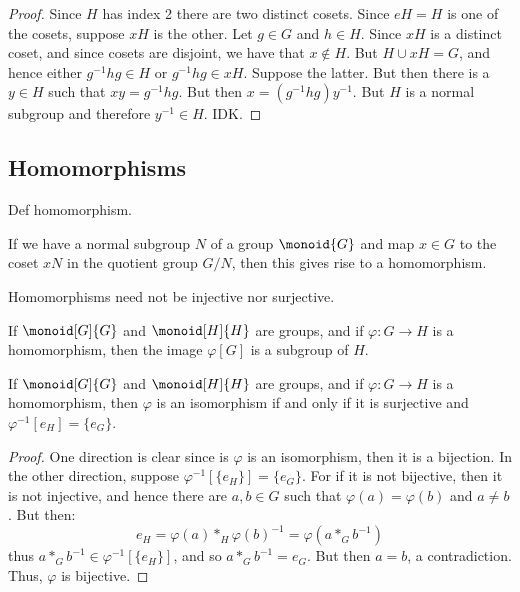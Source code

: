 \documentclass{book}                                                           %
\begin{document}
            \begin{proof}
                Since $H$ has index 2 there are two distinct cosets. Since
                $eH=H$ is one of the cosets, suppose $xH$ is the other.
                Let $g\in{G}$ and $h\in{H}$. Since $xH$ is a distinct coset,
                and since cosets are disjoint, we have that $x\notin{H}$.
                But $H\cup{x}H=G$, and hence either $g^{\minus{1}}hg\in{H}$
                or $g^{\minus{1}}hg\in{x}H$. Suppose the latter. But then
                there is a $y\in{H}$ such that $xy=g^{\minus{1}}hg$.
                But then $x=(g^{\minus{1}}hg)y^{\minus{1}}$. But $H$ is a
                normal subgroup and therefore $y^{\minus{1}}\in{H}$. IDK.
            \end{proof}
        \subsection{Homomorphisms}
            Def homomorphism.
            \begin{example}
                If we have a normal subgroup $N$ of a group $\monoid{G}$ and
                map $x\in{G}$ to the coset $xN$ in the quotient group
                $G/N$, then this gives rise to a homomorphism.
            \end{example}
            Homomorphisms need not be injective nor surjective.
            \begin{theorem}
                If $\monoid[G]{G}$ and $\monoid[H]{H}$ are groups, and if
                $\varphi:G\rightarrow{H}$ is a homomorphism, then
                the image $\varphi[G]$ is a subgroup of $H$.
            \end{theorem}
            \begin{theorem}
                If $\monoid[G]{G}$ and $\monoid[H]{H}$ are groups, and if
                $\varphi:G\rightarrow{H}$ is a homomorphism, then $\varphi$
                is an isomorphism if and only if it is surjective and
                $\varphi^{\minus{1}}[e_{H}]=\{e_{G}\}$.
            \end{theorem}
            \begin{proof}
                One direction is clear since is $\varphi$ is an isomorphism,
                then it is a bijection. In the other direction, suppose
                $\varphi^{\minus{1}}[\{e_{H}\}]=\{e_{G}\}$. For if it is not
                bijective, then it is not injective, and hence there are
                $a,b\in{G}$ such that $\varphi(a)=\varphi(b)$ and $a\ne{b}$.
                But then:
                \begin{equation}
                    e_{H}=\varphi(a)*_{H}\varphi(b)^{\minus{1}}
                         =\varphi(a*_{G}b^{\minus{1}})
                \end{equation}
                thus $a*_{G}b^{\minus{1}}\in\varphi^{\minus{1}}[\{e_{H}\}]$,
                and so $a*_{G}b^{\minus{1}}=e_{G}$. But then $a=b$, a
                contradiction. Thus, $\varphi$ is bijective.
            \end{proof}
\end{document}
